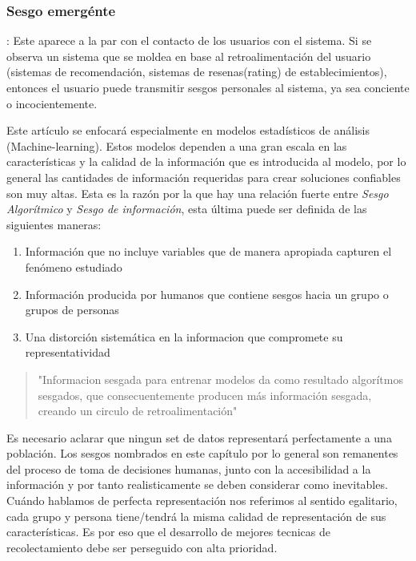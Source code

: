 \subsubsection{Sesgo emergénte}: \label{EmergentBias}
Este aparece a la par con el contacto de los usuarios con el sistema. Si se observa un sistema que se moldea en base al retroalimentación del usuario (sistemas de recomendación, sistemas de resenas(rating) de establecimientos), entonces el usuario puede transmitir sesgos personales al sistema, ya sea conciente o incocientemente.

Este artículo se enfocará especialmente en modelos estadísticos de análisis (Machine-learning).
Estos modelos dependen a una gran escala en las características y la calidad  de la información que es introducida al modelo, por lo general las cantidades de información requeridas para crear soluciones confiables son muy altas. Esta es la razón por la que hay una relación fuerte entre \textsl{Sesgo Algorítmico} y \textsl{Sesgo de información}, esta última puede ser definida de las siguientes maneras:
\begin{enumerate}
  \item Información que no incluye variables que de manera apropiada capturen el fenómeno estudiado
  \item Información producida por humanos que contiene sesgos hacia un grupo o grupos de personas
  \item Una distorción sistemática en la informacion que compromete su representatividad\cite{OCDK19}
\end{enumerate}
\begin{quote}
  "Informacion sesgada para entrenar modelos da como resultado algorítmos sesgados, que consecuentemente producen más información sesgada, creando un circulo de retroalimentación" \cite{GSC18}
\end{quote}

Es necesario aclarar que ningun set de datos representará perfectamente a una población. Los sesgos nombrados en este capítulo por lo general son remanentes del proceso de toma de decisiones humanas, junto con la accesibilidad a la información y por tanto realisticamente se deben considerar como inevitables\cite{GSC18}. Cuándo hablamos de perfecta representación nos referimos al sentido egalitario, cada grupo y persona tiene/tendrá la misma calidad de representación de sus características. Es por eso que el desarrollo de mejores tecnicas de recolectamiento debe ser perseguido con alta prioridad.

